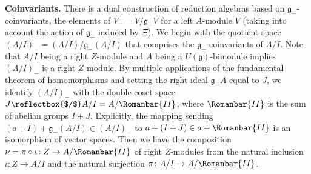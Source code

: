 \documentclass[pdftex]{sigma}
\numberwithin{equation}{section}
\begin{document}
{\bf Coinvariants.}
There is a dual construction of reduction algebras based on $\mathfrak{g}_{-}$-coinvariants, the elements of $V_{-} = V/\mathfrak{g}_{-}V$ for a left $A$-module $V$ (taking into account the action of $\mathfrak{g}_{-}$ induced by $\Xi$).
We begin with the quotient space $(A/I)_{-} = (A/I)/\mathfrak{g}_{-}(A/I)$ that comprises the $\mathfrak{g}_{-}$-coinvariants of $A/I$. Note that $A/I$ being a right $Z$-module and $A$ being a $U(\mathfrak{g})$-bimodule implies $(A/I)_{-}$ is a right $Z$-module. By multiple applications of the fundamental theorem of homomorphisms and setting the right ideal $\mathfrak{g}_{-}A$ equal to $J$, we identify $(A/I)_{-}$ with the double coset space $J\reflectbox{$/$}A/I = A/\Romanbar{II}$, where $\Romanbar{II}$ is the sum of abelian groups $I + J$. Explicitly, the mapping sending $(a + I) + \mathfrak{g}_{-}(A/I) \in (A/I)_{-}$ to $a + (I + J) \in a + \Romanbar{II}$ is an isomorphism of vector spaces. Then we have the composition $\nu = \pi\circ\iota\colon Z \rightarrow A/\Romanbar{II}$ of right $Z$-modules from the natural inclusion~${\iota\colon Z\rightarrow A/I}$ and the natural surjection $\pi\colon A/I \rightarrow A/\Romanbar{II}$.
\end{document}
